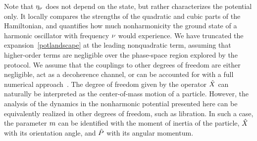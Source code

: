 \documentclass[reprint,prx,footinbib,floatfix,twocolumn,longbibliography,superscriptaddress]{revtex4-2}
\begin{document}
Note that $\eta_{\nu}$ does not depend on the state, but rather characterizes the potential only.
It locally compares the strengths of the quadratic and cubic parts of the Hamiltonian, and quantifies how much nonharmonicity the ground state of a harmonic oscillator with frequency $\nu$ would experience.
We have truncated the expansion~\eqref{potlandscape} at the leading nonquadratic term, assuming that higher-order terms are negligible over the phase-space region explored by the protocol.
We assume that the couplings to other degrees of freedom are either negligible, act as a decoherence channel, or can be accounted for with a full numerical approach~\cite{Roda-Llordes2024b}.
The degree of freedom given by the operator $\hat{X}$ can naturally be interpreted as the center-of-mass motion of a particle.
However, the analysis of the dynamics in the nonharmonic potential presented here can be equivalently realized in other degrees of freedom, such as libration.
In such a case, the parameter $m$ can be identified with the moment of inertia of the particle, $\hat{X}$ with its orientation angle, and $\hat{P}$ with its angular momentum.
\end{document}
